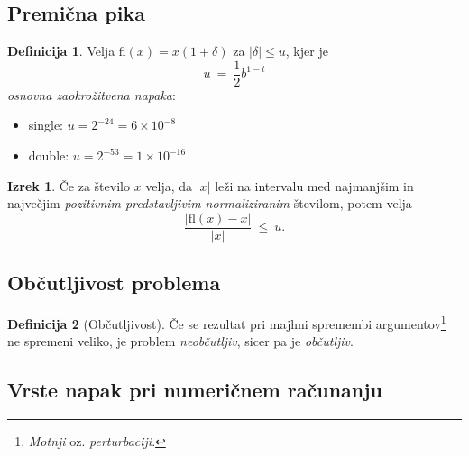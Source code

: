 \documentclass[11pt]{article}
\theoremstyle{definition}
\newtheorem{definicija}{Definicija}[section]
\newtheorem{izrek}{Izrek}
\begin{document}
\subsection{Premična pika}
\vspace{0.5cm}

\begin{definicija}

Velja fl$(x) = x(1 + \delta)$ za $|\delta| \leq u$, kjer je
$$u ~=~ \frac{1}{2}b^{1-t}$$
\textit{osnovna zaokrožitvena napaka}:

\begin{itemize}
	\item single: $u = 2^{-24} = 6 \times 10^{-8}$
	\item double: $u = 2^{-53} = 1 \times 10^{-16}$
\end{itemize}

\end{definicija}
\vspace{0.5cm}

\begin{izrek}

Če za število $x$ velja, da $|x|$ leži na intervalu med najmanjšim in največjim \textit{pozitivnim predstavljivim normaliziranim} številom, potem velja
$$\frac{|\text{fl}(x) - x|}{|x|} ~\leq~ u.$$

\end{izrek}
\vspace{0.5cm}


\subsection{Občutljivost problema}
\vspace{0.5cm}

\begin{definicija}[Občutljivost]

Če se rezultat pri majhni spremembi argumentov\footnote{\textit{Motnji} oz. \textit{perturbaciji}.} ne spremeni veliko, je problem \textit{neobčutljiv}, sicer pa je \textit{občutljiv}.

\end{definicija}
\vspace{0.5cm}


\subsection{Vrste napak pri numeričnem računanju}
\vspace{0.5cm}
\end{document}
